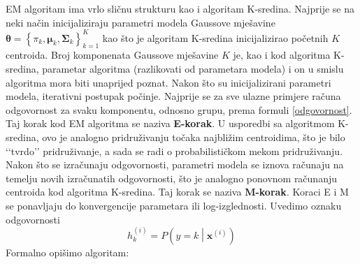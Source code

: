 \documentclass[times, utf8, zavrsni]{fer}
\begin{document}
EM algoritam ima vrlo sličnu strukturu kao i algoritam K-sredina. Najprije se na neki način inicijaliziraju parametri modela Gaussove mješavine $\boldsymbol{\theta} = 
\left\{\pi_k, \boldsymbol{\mu}_k, \boldsymbol{\Sigma}_k\right\}_{k=1}^{K}$ kao što je algoritam K-sredina inicijalizirao početnih $K$ centroida. Broj komponenata Gaussove mješavine $K$ je, kao i kod algoritma K-sredina, parametar algoritma (razlikovati od parametara modela) i on u smislu algoritma mora biti unaprijed poznat. Nakon što su inicijalizirani parametri modela, iterativni postupak počinje. Najprije se za sve ulazne primjere računa odgovornost za svaku komponentu, odnosno grupu, prema formuli \ref{odgovornost}. Taj korak kod EM algoritma se naziva \textbf{E-korak}. U usporedbi sa algoritmom K-sredina, ovo je analogno pridruživanju točaka najbližim centroidima, što je bilo ‘‘tvrdo’’ pridruživanje, a sada se radi o probabilističkom mekom pridruživanju. Nakon što se izračunaju odgovornosti, parametri modela se iznova računaju na temelju novih izračunatih odgovornosti, što je analogno ponovnom računanju centroida kod algoritma K-sredina. Taj korak se naziva \textbf{M-korak}. Koraci E i M se ponavljaju do konvergencije parametara ili log-izglednosti. Uvedimo oznaku odgovornosti
\[h_{k}^{(i)} = P \left(y = k \middle| \mathbf{x}^{(i)}\right)\]
Formalno opišimo algoritam:
\end{document}
